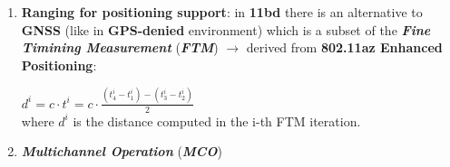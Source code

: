 \begin{enumerate}[nosep]
    \item \textbf{Ranging for positioning support}: in \textbf{11bd} there is an alternative to \textbf{GNSS} (like in \textbf{GPS-denied} environment) which is a subset of the \textbf{\textit{Fine Timining Measurement}} (\textbf{\textit{FTM}}) $\rightarrow$ derived from \textbf{802.11az Enhanced Positioning}:
    \begin{center}
        $d^i = c \cdot t^i = c \cdot \frac{(t^i_4 -t^i_1) - (t^i_3 - t^i_2)}{2}$ \\
        where $d^i$ is the distance computed in the i-th FTM iteration.
    \end{center}

    \item \textbf{\textit{Multichannel Operation}} (\textbf{\textit{MCO}})

\end{enumerate}